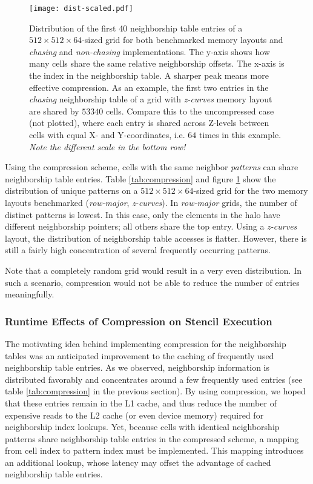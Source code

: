 \begin{figure}
	\begin{center}
		\texttt{[image: dist-scaled.pdf]}
		\caption{\label{fig:comp-dist} Distribution of the first 40 neighborship table entries of a $512\times 512\times 64$-sized grid for both benchmarked memory layouts and \emph{chasing} and \emph{non-chasing} implementations. The y-axis shows how many cells share the same relative neighborship offsets. The x-axis is the index in the neighborship table. A sharper peak means more effective compression. As an example, the first two entries in the \emph{chasing} neighborship table of a grid with \emph{z-curves} memory layout are shared by $53340$ cells. Compare this to the uncompressed case (not plotted), where each entry is shared across Z-levels between cells with equal X- and Y-coordinates, i.e. $64$ times in this example. \emph{Note the different scale in the bottom row!}}
	\end{center}
\end{figure}

Using the compression scheme, cells with the same neighbor \emph{patterns} can share neighborship table entries. Table \ref{tab:compression} and figure \ref{fig:comp-dist} show the distribution of unique patterns on a $512\times 512\times 64$-sized grid for the two memory layouts benchmarked (\emph{row-major}, \emph{z-curves}). In \emph{row-major} grids, the number of distinct patterns is lowest. In this case, only the elements in the halo have different neighborship pointers; all others share the top entry. Using a \emph{z-curves} layout, the distribution of neighborship table accesses is flatter. However, there is still a fairly high concentration of several frequently occurring patterns.

Note that a completely random grid would result in a very even distribution. In such a scenario, compression would not be able to reduce the number of entries meaningfully. 

\subsubsection{Runtime Effects of Compression on Stencil Execution}

The motivating idea behind implementing compression for the neighborship tables was an anticipated improvement to the caching of frequently used neighborship table entries. As we observed, neighborship information is distributed favorably and concentrates around a few frequently used entries (see table \ref{tab:compression} in the previous section). By using compression, we hoped that these entries remain in the L1 cache, and thus reduce the number of expensive reads to the L2 cache (or even device memory) required for neighborship index lookups. Yet, because cells with identical neighborship patterns share neighborship table entries in the compressed scheme, a mapping from cell index to pattern index must be implemented. This mapping introduces an additional lookup, whose latency may offset the advantage of cached neighborship table entries.

